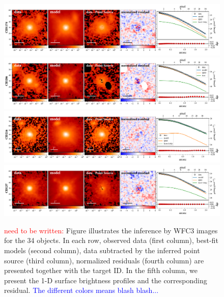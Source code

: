 \documentclass[apj]{emulateapj}
\begin{document}
\begin{figure}
\centering
{
\includegraphics[height=0.25\textwidth]{fig/best_fit_CID1174_SB_profile.pdf}
\includegraphics[height=0.25\textwidth]{fig/best_fit_CID206_SB_profile.pdf}
\includegraphics[height=0.25\textwidth]{fig/best_fit_CID216_SB_profile.pdf}
\includegraphics[height=0.25\textwidth]{fig/best_fit_CID237_SB_profile.pdf}
\caption{\label{fig:QSO_decomp} 
\textcolor{red}{need to be written:}
Figure illustrates the inference by WFC3 images for the 34 objects.
In each row, observed data (first column), best-fit models (second column), data subtracted by the inferred point source (third column),  normalized residuals (fourth column) are presented together with the target ID. In the fifth column, we present the 1-D surface brightness profiles and the corresponding residual. \textcolor{blue}{The different colors means blash blash...}
}}
\end{figure} 
\end{document}
